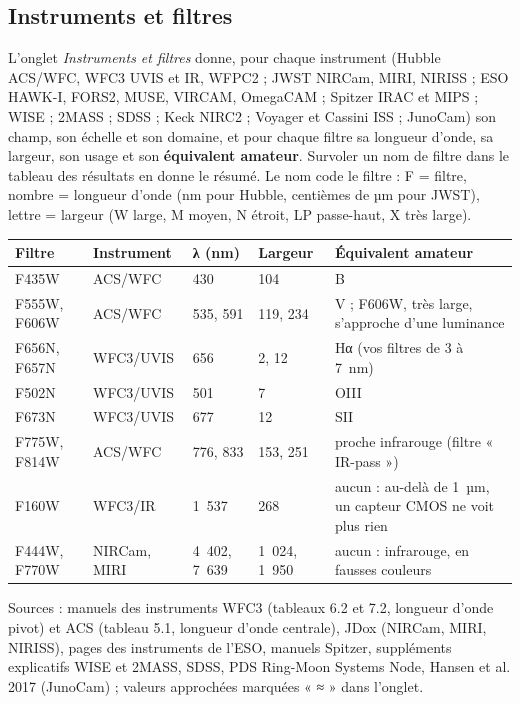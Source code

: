 \subsection{Instruments et filtres}
L'onglet \emph{Instruments et filtres} donne, pour chaque instrument (Hubble ACS/WFC, WFC3 UVIS et IR, WFPC2 ; JWST
NIRCam, MIRI, NIRISS ; ESO HAWK-I, FORS2, MUSE, VIRCAM, OmegaCAM ; Spitzer IRAC et MIPS ; WISE ; 2MASS ; SDSS ;
Keck NIRC2 ; Voyager et Cassini ISS ; JunoCam) son champ, son échelle et son domaine, et pour chaque filtre sa
longueur d'onde, sa largeur, son usage et son \textbf{équivalent amateur}. Survoler un nom de filtre dans le tableau
des résultats en donne le résumé. Le nom code le filtre : F = filtre, nombre = longueur d'onde (nm pour Hubble,
centièmes de µm pour JWST), lettre = largeur (W large, M moyen, N étroit, LP passe-haut, X très large).
\begin{center}\small
\begin{tabularx}{\linewidth}{@{}llllX@{}}
\toprule
\textbf{Filtre} & \textbf{Instrument} & \textbf{λ (nm)} & \textbf{Largeur} & \textbf{Équivalent amateur}\\
\midrule
F435W & ACS/WFC & 430 & 104 & B\\
F555W, F606W & ACS/WFC & 535, 591 & 119, 234 & V ; F606W, très large, s'approche d'une luminance\\
F656N, F657N & WFC3/UVIS & 656 & 2, 12 & Hα (vos filtres de 3 à 7~nm)\\
F502N & WFC3/UVIS & 501 & 7 & OIII\\
F673N & WFC3/UVIS & 677 & 12 & SII\\
F775W, F814W & ACS/WFC & 776, 833 & 153, 251 & proche infrarouge (filtre « IR-pass »)\\
F160W & WFC3/IR & 1~537 & 268 & aucun : au-delà de 1~µm, un capteur CMOS ne voit plus rien\\
F444W, F770W & NIRCam, MIRI & 4~402, 7~639 & 1~024, 1~950 & aucun : infrarouge, en fausses couleurs\\
\bottomrule
\end{tabularx}
\end{center}
Sources : manuels des instruments WFC3 (tableaux 6.2 et 7.2, longueur d'onde pivot) et ACS (tableau 5.1, longueur
d'onde centrale), JDox (NIRCam, MIRI, NIRISS), pages des instruments de l'ESO, manuels Spitzer, suppléments
explicatifs WISE et 2MASS, SDSS, PDS Ring-Moon Systems Node, Hansen et al. 2017 (JunoCam) ; valeurs approchées
marquées « ≈ » dans l'onglet.

